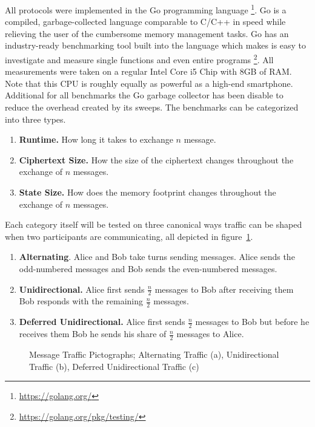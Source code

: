 \documentclass[11pt,a4paper,twoside,openright,bibliography=totoc]{scrbook}
\begin{document}
All protocols were implemented in the Go programming
language \footnote{\url{https://golang.org/}}. Go is a compiled,
garbage-collected language comparable to C/C++ in speed
while relieving the user of the cumbersome memory management
tasks. Go has an industry-ready benchmarking tool built
into the language which makes is easy to investigate and
measure single functions and even entire
programs \footnote{\url{https://golang.org/pkg/testing/}}.
All measurements were taken on a regular Intel Core i5 Chip
with 8GB of RAM. Note that this CPU is roughly equally as
powerful as a high-end smartphone. Additional for all benchmarks
the Go garbage collector has been disable to reduce the
overhead created by its sweeps.
The benchmarks can be categorized into three types.
\begin{enumerate}
\item \textbf{Runtime.} How long it takes to exchange $n$ message.
\item \textbf{Ciphertext Size.} How the size of the ciphertext changes
  throughout the exchange of $n$ messages.
\item \textbf{State Size.} How does the memory footprint changes
  throughout the exchange of $n$ messages.
\end{enumerate}
Each category itself will be tested on three canonical ways
traffic can be shaped when two participants are communicating,
all depicted in figure~\ref{fig:picto}.
\begin{enumerate}
\item \textbf{Alternating}. Alice and Bob take turns sending messages. Alice
  sends the odd-numbered messages and Bob sends the even-numbered messages.
\item \textbf{Unidirectional.} Alice first sends $\frac{n}{2}$ messages
  to Bob after receiving them Bob responds with the remaining $\frac{n}{2}$ messages.
\item \textbf{Deferred Unidirectional.} Alice first sends $\frac{n}{2}$ messages
  to Bob but before he receives them Bob he sends his share of $\frac{n}{2}$
  messages to Alice.
\end{enumerate}

\begin{figure}[H]
  \centering
  \noindent\begin{subfigure}[t]{0.32\linewidth}
    \centering
    
    \caption{}
  \end{subfigure}%
  \begin{subfigure}[t]{0.32\linewidth}
    \centering
    
    \caption{}
  \end{subfigure}%
  \begin{subfigure}[t]{0.32\linewidth}
    \centering
    
    \caption{}
  \end{subfigure}
  \caption[Message Traffic Pictographs]{Message Traffic Pictographs;
    Alternating Traffic (a), Unidirectional
    Traffic (b), Deferred Unidirectional Traffic (c)}
  \label{fig:picto}
\end{figure}
\end{document}
